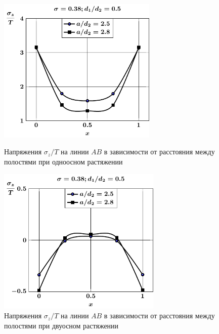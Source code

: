 \begin{russian}
\begin{figure}[h!]
\centering\footnotesize
\parbox[b]{7.5cm}{\centering\includegraphics[width=7.6cm]{periodic-oblate-cav27-a-d50-t1-sig_z.pdf}
\caption{Напряжения $\sigma_z/T$ на линии $AB$ в зависимости от расстояния между полостями при одноосном растяжении
\label{f:11:39}}}\hfil\hfil
\parbox[b]{7.5cm}{\centering\includegraphics[width=7.8cm]{periodic-oblate-cav27-a-d50-t2-sig_z.pdf}
\caption{Напряжения $\sigma_z/T$ на линии $AB$ в зависимости от расстояния между полостями при двуосном растяжении
\label{f:11:40}}}
\end{figure}


\end{russian}
